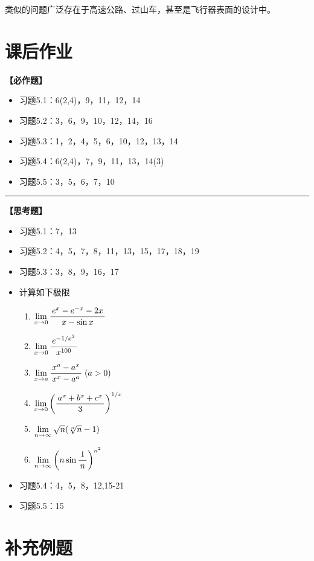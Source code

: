类似的问题广泛存在于高速公路、过山车，甚至是飞行器表面的设计中。

\newpage

\section*{课后作业}

{\bf 【必作题】}

\begin{itemize}
  \item 习题5.1：6(2,4)，9，11，12，14
  \item 习题5.2：3，6，9，10，12，14，16
  \item 习题5.3：1，2，4，5，6，10，12，13，14
  \item 习题5.4：6(2,4)，7，9，11，13，14(3)
  \item 习题5.5：3，5，6，7，10
\end{itemize}

\bigskip

\hrule

\bigskip
\bigskip

{\bf 【思考题】}

\begin{itemize}
  \item 习题5.1：7，13
  \item 习题5.2：4，5，7，8，11，13，15，17，18，19
  \item 习题5.3：3，8，9，16，17
  \item 计算如下极限
  	\begin{enumerate}
	  \item $\lim\limits_{x\to{0}}\displaystyle\frac{\,{e^x-e^{-x}-2x}\,}{\,{x-\sin x}\,}$ 
	  \item $\lim\limits_{x\to{0}}\displaystyle\frac{\,{e^{-1/x^2}}\,}{\,{x^{100}}\,}$ 
	  \item $\lim\limits_{x\to{a}}\displaystyle\frac{\,{x^a-a^x}\,}{\,{x^x-a^a}\,}\;(a>0)$ 
	  \item $\lim\limits_{x\to{0}}\left(\displaystyle\frac{\,{a^x+b^x+c^x}\,}{\,{3}\,}\right)^{1/x}$ 
	  \item $\lim\limits_{n\to\infty}\sqrt{n}(\sqrt[n]{n}-1)$ 
	  \item $\lim\limits_{n\to\infty}\left(n\sin\displaystyle\frac{\,{1}\,}{\,{n}\,}\right)^{n^2}$
	\end{enumerate}	
  \item 习题5.4：4，5，8，12,15-21
  \item 习题5.5：15
\end{itemize}

\newpage

\section*{补充例题}

